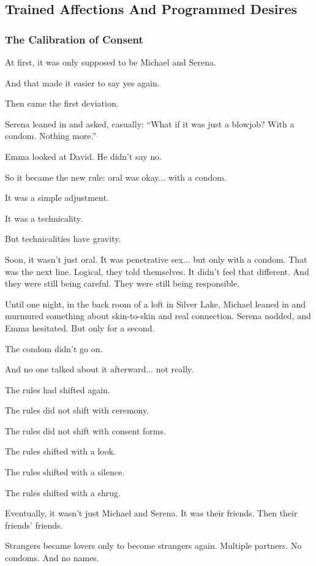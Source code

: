 
\subsection{Trained Affections And Programmed Desires}

\subsubsection{The Calibration of Consent}

At first, it was only supposed to be Michael and Serena.

And that made it easier to say yes again.

Then came the first deviation.

Serena leaned in and asked, casually: 
``What if it was just a blowjob? With a condom. Nothing more.''

Emma looked at David. He didn’t say no.

So it became the new rule: oral was okay... with a condom.

It was a simple adjustment. 

It was a technicality.

But technicalities have gravity.

Soon, it wasn’t just oral.
It was penetrative sex... but only with a condom.
That was the next line. Logical, they told themselves. It didn’t feel that different. And they were 
still being careful. They were still being responsible.

Until one night, in the back room of a loft in Silver Lake, Michael leaned in and murmured something 
about skin-to-skin and real connection. Serena nodded, and Emma hesitated. But only for a second.

The condom didn’t go on.

And no one talked about it afterward... not really.

The rules had shifted again.

The rules did not shift with ceremony. 

The rules did not shift with consent forms.

The rules shifted with a look. 

The rules shifted with a silence. 

The rules shifted with a shrug.

Eventually, it wasn’t just Michael and Serena.
It was their friends.
Then their friends’ friends.

Strangers became lovers only to become strangers again.
Multiple partners.
No condoms.
And no names.

